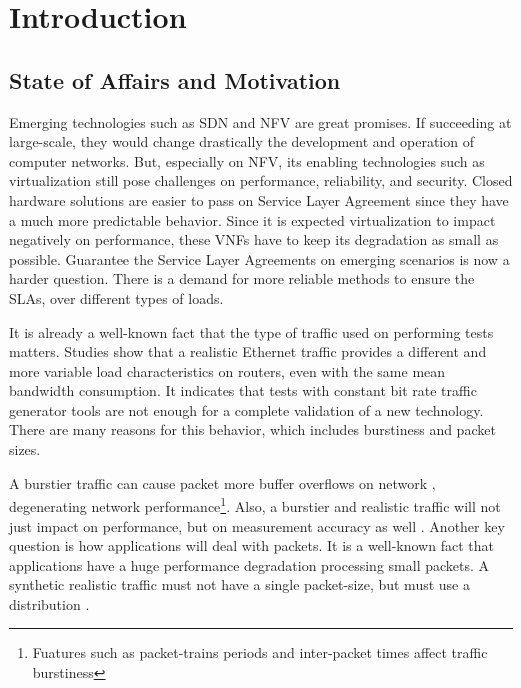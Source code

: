 \chapter{Introduction}\label{ch:introduction}

\section{State of Affairs and Motivation}\label{sec:state-of-the-art}
 

Emerging technologies such as SDN and NFV are great promises. If succeeding at large-scale, they would change drastically the development and operation of computer networks. But, especially on NFV, its enabling technologies such as virtualization still pose challenges on performance,  reliability, and security\cite{nfv-challenges}. Closed hardware solutions are easier to pass on Service Layer Agreement since they have a much more predictable behavior. Since it is expected virtualization to impact negatively on performance, these VNFs have to keep its degradation as small as possible. Guarantee the Service Layer Agreements on emerging scenarios is now a harder question. There is a demand for more reliable methods to ensure the SLAs, over different types of loads.


It is already a well-known fact that the type of traffic used on performing tests matters. Studies show that a realistic Ethernet traffic provides a different and more variable load characteristics on routers\cite{harpoon-validation}, even with the same mean bandwidth consumption. It indicates that tests with constant bit rate traffic generator tools are not enough for a complete validation of a new technology. There are many reasons for this behavior, which includes burstiness and packet sizes.


A burstier traffic can cause packet more buffer overflows on network \cite{burstiness-queue-lenght} \cite{modelling-of-self-similar} \cite{empirical-interarrival-study}, degenerating network performance\footnote{Fuatures such as packet-trains periods and inter-packet times affect traffic burstiness}. Also, a burstier and realistic traffic will not just impact on performance, but on measurement accuracy as well \cite{legotg-paper} \cite{background-traffic-matter}. Another key question is how applications will deal with packets. It is a well-known fact that applications have a huge performance degradation processing small packets\cite{comparative-trafficgen-tools}. A synthetic realistic traffic must not have a single packet-size, but must use a distribution \cite{packet-distribution-model}. 


